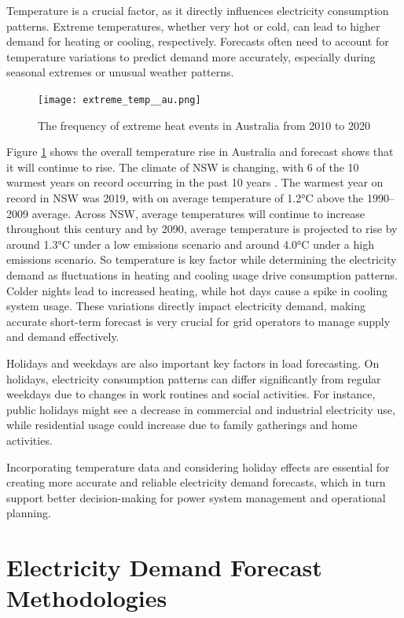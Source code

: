 \documentclass[mstat,12pt]{unswthesis}
\begin{document}
Temperature is a crucial factor, as it directly influences electricity
consumption patterns. Extreme temperatures, whether very hot or cold,
can lead to higher demand for heating or cooling, respectively.
Forecasts often need to account for temperature variations to predict
demand more accurately, especially during seasonal extremes or unusual
weather patterns.

\begin{figure}[H]
\centering
\texttt{[image: extreme\_temp\_\_au.png]}
\caption{The frequency of extreme heat events in Australia from 2010 to 2020}\label{extreme}
\end{figure}

Figure \ref{extreme} shows the overall temperature rise in Australia and
forecast shows that it will continue to rise. The climate of NSW is
changing, with 6 of the 10 warmest years on record occurring in the past
10 years \cite{nswAdaptNSW}. The warmest year on record in NSW was 2019,
with on average temperature of 1.2°C above the 1990--2009 average.
Across NSW, average temperatures will continue to increase throughout
this century and by 2090, average temperature is projected to rise by
around 1.3°C under a low emissions scenario and around 4.0°C under a
high emissions scenario. So temperature is key factor while determining
the electricity demand as fluctuations in heating and cooling usage
drive consumption patterns. Colder nights lead to increased heating,
while hot days cause a spike in cooling system usage. These variations
directly impact electricity demand, making accurate short-term forecast
is very crucial for grid operators to manage supply and demand
effectively.

Holidays and weekdays are also important key factors in load
forecasting. On holidays, electricity consumption patterns can differ
significantly from regular weekdays due to changes in work routines and
social activities. For instance, public holidays might see a decrease in
commercial and industrial electricity use, while residential usage could
increase due to family gatherings and home activities.

Incorporating temperature data and considering holiday effects are
essential for creating more accurate and reliable electricity demand
forecasts, which in turn support better decision-making for power system
management and operational planning.

\section{Electricity Demand Forecast
Methodologies}\label{electricity-demand-forecast-methodologies}
\end{document}
